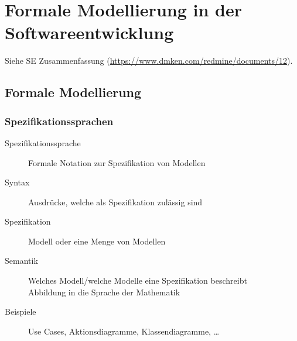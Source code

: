 

												\chapter{Formale Modellierung in der Softwareentwicklung}
													Siehe SE Zusammenfassung (\url{https://www.dmken.com/redmine/documents/12}).

													\section{Formale Modellierung}
														\subsection{Spezifikationssprachen}
															\begin{description}
																\item[Spezifikationssprache] Formale Notation zur Spezifikation von Modellen
																\item[Syntax] Ausdrücke, welche als Spezifikation zulässig sind
																\item[Spezifikation] Modell oder eine Menge von Modellen
																\item[Semantik] Welches Modell/welche Modelle eine Spezifikation beschreibt \\ Abbildung in die Sprache der Mathematik
																\item[Beispiele] Use Cases, Aktionsdiagramme, Klassendiagramme, \dots
															\end{description}

